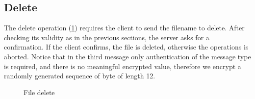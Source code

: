 \subsection{Delete}
The delete operation (\cref{fig:transport_protocol_file_delete}) requires the client to send the filename to delete. After checking its validity as in the previous sections, the server asks for a confirmation. If the client confirms, the file is deleted, otherwise the operations is aborted. Notice that in the third message only authentication of the message type is required, and there is no meaningful encrypted value, therefore we encrypt a randomly generated sequence of byte of length 12.
\begin{figure}
    \centering
    \setlength{\instdist}{8.5cm}
    \setmscoptions
    \begin{msc}{}



        \nextlevel[2]

        \nextlevel[3]


        \nextlevel

        \nextlevel[4]

        \nextlevel
        \nextlevel[5]


        \nextlevel[2]

        \nextlevel[4]
        \nextlevel
    \end{msc}
    \centering
    \caption{File delete}
    \label{fig:transport_protocol_file_delete}
\end{figure}

